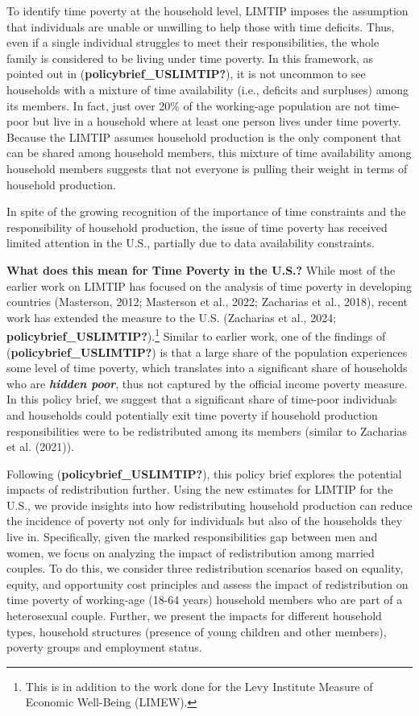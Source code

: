\documentclass[
  11pt,
]{article}
\begin{document}
To identify time poverty at the household level, LIMTIP imposes the
assumption that individuals are unable or unwilling to help those with
time deficits. Thus, even if a single individual struggles to meet their
responsibilities, the whole family is considered to be living under time
poverty. In this framework, as pointed out in
(\textbf{policybrief\_USLIMTIP?}), it is not uncommon to see households
with a mixture of time availability (i.e., deficits and surpluses) among
its members. In fact, just over 20\% of the working-age population are
not time-poor but live in a household where at least one person lives
under time poverty. Because the LIMTIP assumes household production is
the only component that can be shared among household members, this
mixture of time availability among household members suggests that not
everyone is pulling their weight in terms of household production.

In spite of the growing recognition of the importance of time
constraints and the responsibility of household production, the issue of
time poverty has received limited attention in the U.S., partially due
to data availability constraints.

\textbf{What does this mean for Time Poverty in the U.S.?} While most of
the earlier work on LIMTIP has focused on the analysis of time poverty
in developing countries (Masterson, 2012; Masterson et al., 2022;
Zacharias et al., 2018), recent work has extended the measure to the
U.S. (Zacharias et al., 2024;
\textbf{policybrief\_USLIMTIP?}).\footnote{This is in addition to the
  work done for the Levy Institute Measure of Economic Well-Being
  (LIMEW).} Similar to earlier work, one of the findings of
(\textbf{policybrief\_USLIMTIP?}) is that a large share of the
population experiences some level of time poverty, which translates into
a significant share of households who are \textbf{\emph{hidden poor}},
thus not captured by the official income poverty measure. In this policy
brief, we suggest that a significant share of time-poor individuals and
households could potentially exit time poverty if household production
responsibilities were to be redistributed among its members (similar to
Zacharias et al. (2021)).

Following (\textbf{policybrief\_USLIMTIP?}), this policy brief explores
the potential impacts of redistribution further. Using the new estimates
for LIMTIP for the U.S., we provide insights into how redistributing
household production can reduce the incidence of poverty not only for
individuals but also of the households they live in. Specifically, given
the marked responsibilities gap between men and women, we focus on
analyzing the impact of redistribution among married couples. To do
this, we consider three redistribution scenarios based on equality,
equity, and opportunity cost principles and assess the impact of
redistribution on time poverty of working-age (18-64 years) household
members who are part of a heterosexual couple. Further, we present the
impacts for different household types, household structures (presence of
young children and other members), poverty groups and employment status.
\end{document}
